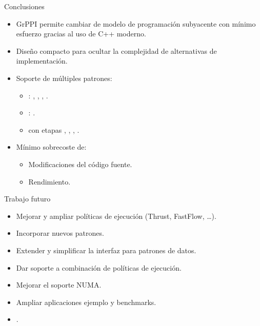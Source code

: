 \begin{frame}[t]{Conclusiones}
\begin{itemize}
  \item GrPPI permite cambiar de modelo de programación subyacente con mínimo esfuerzo
        gracias al uso de C++ moderno.
  \vfill\pause
  \item Diseño compacto para ocultar la complejidad de alternativas de implementación.
  \vfill\pause
  \item Soporte de múltiples patrones:
    \begin{itemize}
      \item {}: , , , .
      \item {}: .
      \item {}  con etapas , , ,
                                 .
    \end{itemize}
  \vfill\pause
  \item Mínimo sobrecoste de:
    \begin{itemize}
      \item Modificaciones del código fuente.
      \item Rendimiento.
    \end{itemize}
\end{itemize}
\end{frame}

\begin{frame}[t]{Trabajo futuro}
\begin{itemize}
  \item Mejorar y ampliar políticas de ejecución (Thrust, FastFlow, \ldots).
  \item Incorporar nuevos patrones.
  \item Extender y simplificar la interfaz para patrones de datos.
  \item Dar soporte a combinación de políticas de ejecución.
  \item Mejorar el soporte NUMA.
  \item Ampliar aplicaciones ejemplo y benchmarks.
  \vfill
  \item {}.
\end{itemize}
\end{frame}

